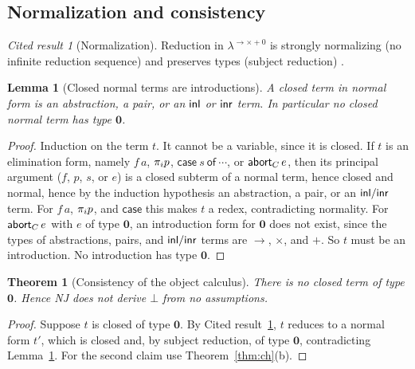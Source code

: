\documentclass[11pt]{article}
\theoremstyle{definition}
\theoremstyle{plain}
\newtheorem{theorem}[definition]{Theorem}
\newtheorem{lemma}[definition]{Lemma}
\theoremstyle{remark}
\newtheorem{cited}[definition]{Cited result}
\begin{document}
\subsection{Normalization and consistency}

\begin{cited}[Normalization]\label{cit:sn}
Reduction in $\lambda^{\to\times+0}$ is strongly normalizing (no infinite reduction sequence) and preserves types (subject reduction) \cite{Tait67,GLT89}.
\end{cited}

\begin{lemma}[Closed normal terms are introductions]\label{lem:intro}
A closed term in normal form is an abstraction, a pair, or an $\mathsf{inl}$ or $\mathsf{inr}$ term. In particular no closed normal term has type $\mathbf 0$.
\end{lemma}
\begin{proof}
Induction on the term $t$. It cannot be a variable, since it is closed. If $t$ is an elimination form, namely $f\,a$, $\pi_ip$, $\mathsf{case}\ s\ \mathsf{of}\ \cdots$, or $\mathsf{abort}_C\,e$, then its principal argument ($f$, $p$, $s$, or $e$) is a closed subterm of a normal term, hence closed and normal, hence by the induction hypothesis an abstraction, a pair, or an $\mathsf{inl}/\mathsf{inr}$ term. For $f\,a$, $\pi_ip$, and $\mathsf{case}$ this makes $t$ a redex, contradicting normality. For $\mathsf{abort}_C\,e$ with $e$ of type $\mathbf 0$, an introduction form for $\mathbf 0$ does not exist, since the types of abstractions, pairs, and $\mathsf{inl}/\mathsf{inr}$ terms are $\to$, $\times$, and $+$. So $t$ must be an introduction. No introduction has type $\mathbf 0$.
\end{proof}

\begin{theorem}[Consistency of the object calculus]\label{thm:consistency-stlc}
There is no closed term of type $\mathbf 0$. Hence NJ does not derive $\bot$ from no assumptions.
\end{theorem}
\begin{proof}
Suppose $t$ is closed of type $\mathbf 0$. By Cited result~\ref{cit:sn}, $t$ reduces to a normal form $t'$, which is closed and, by subject reduction, of type $\mathbf 0$, contradicting Lemma~\ref{lem:intro}. For the second claim use Theorem~\ref{thm:ch}(b).
\end{proof}
\end{document}
